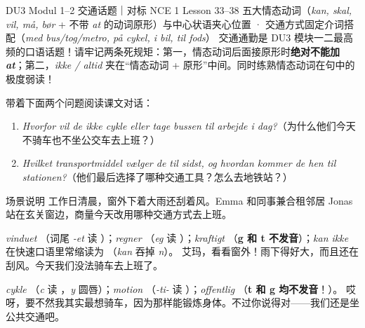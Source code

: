 {DU3 Modul 1--2 交通话题｜对标 NCE 1 Lesson 33--38}
{五大情态动词（\textit{kan, skal, vil, må, bør} + 不带 \textit{at} 的动词原形）与中心状语夹心位置 · 交通方式固定介词搭配（\textit{med bus/tog/metro, på cykel, i bil, til fods}）}
{交通通勤是 DU3 模块一二最高频的口语话题！请牢记两条死规矩：第一，情态动词后面接原形时\textbf{绝对不能加 \textit{at}}；第二，\textit{ikke / altid} 夹在“情态动词 + 原形”中间。同时练熟情态动词在句中的极度弱读！}

\begin{foerduleaeser}
带着下面两个问题阅读课文对话：
\begin{enumerate}
  \item \textit{Hvorfor vil de ikke cykle eller tage bussen til arbejde i dag?}（为什么他们今天不骑车也不坐公交车去上班？）
  \item \textit{Hvilket transportmiddel vælger de til sidst, og hvordan kommer de hen til stationen?}（他们最后选择了哪种交通工具？怎么去地铁站？）
\end{enumerate}
\end{foerduleaeser}


\begin{tipbox}{场景说明}
工作日清晨，窗外下着大雨还刮着风。Emma 和同事兼合租邻居 Jonas 站在玄关窗边，商量今天改用哪种交通方式去上班。
\end{tipbox}

{\textit{vinduet} （词尾 \textit{-et} 读 ）；\textit{regner} （\textit{eg} 读 ）；\textit{kraftigt} （\textbf{g 和 t 不发音}）；\textit{kan ikke} 在快速口语里常缩读为 （\textit{kan} 吞掉 \textit{n}）。}
{艾玛，看看窗外！雨下得好大，而且还在刮风。今天我们没法骑车去上班了。}

{\textit{cykle} （\textit{c} 读 ，\textit{y} 圆唇）；\textit{motion} （\textit{-ti-} 读 ）；\textit{offentlig} （\textbf{t 和 g 均不发音}！）。}
{哎呀，要不然我其实最想骑车，因为那样能锻炼身体。不过你说得对——我们还是坐公共交通吧。}

